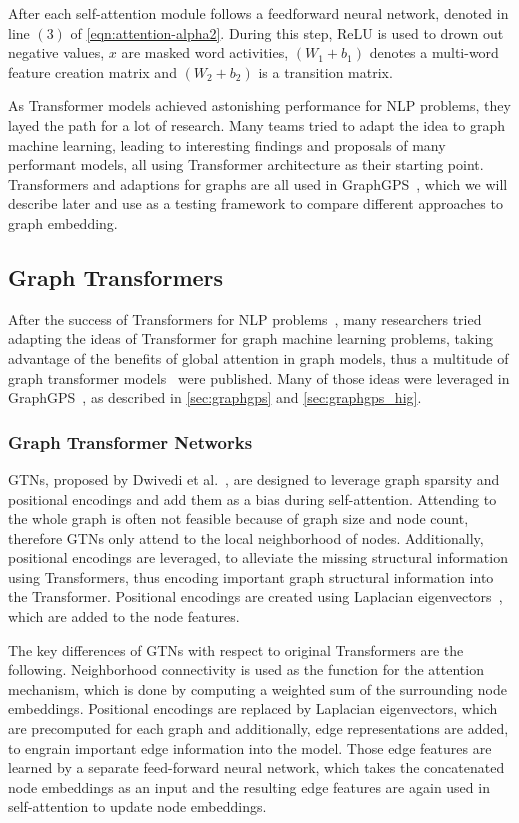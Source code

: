 After each self-attention module follows a feedforward neural network, denoted in line $(3)$ of \autoref{eqn:attention-alpha2}. During this step, ReLU is used to drown out negative values, $x$ are masked word activities, $(W_1 + b_1)$ denotes a multi-word feature creation matrix and $(W_2 + b_2)$ is a transition matrix.

As Transformer models achieved astonishing performance for NLP problems, they layed the path for a lot of research. Many teams tried to adapt the idea to graph machine learning, leading to interesting findings and proposals of many performant models, all using Transformer architecture as their starting point. Transformers and adaptions for graphs are all used in GraphGPS~\cite{2023graphgps}, which we will describe later and use as a testing framework to compare different approaches to graph embedding.
\subsection{Graph Transformers}
After the success of Transformers for NLP problems~\cite{kalyan2021ammus}, many researchers tried adapting the ideas of Transformer for graph machine learning problems, taking advantage of the benefits of global attention in graph models, thus a multitude of graph transformer models~\cite{dwivedi2021generalizationTransformer,2021graphormer,kreuzer2021rethinking,mialon2021graphit,wu2022representing} were published. Many of those ideas were leveraged in GraphGPS~\cite{2023graphgps}, as described in \ref{sec:graphgps} and \ref{sec:graphgps_hig}.

\subsubsection{Graph Transformer Networks}
GTNs, proposed by Dwivedi et al.~\cite{dwivedi2021generalizationTransformer}, are designed to leverage graph sparsity and positional encodings and add them as a bias during self-attention. Attending to the whole graph is often not feasible because of graph size and node count, therefore GTNs only attend to the local neighborhood of nodes. Additionally, positional encodings are leveraged, to alleviate the missing structural information using Transformers, thus encoding important graph structural information into the Transformer. Positional encodings are created using Laplacian eigenvectors~\cite{belkin2003laplacian}, which are added to the node features.

The key differences of GTNs with respect to original Transformers are the following. Neighborhood connectivity is used as the function for the attention mechanism, which is done by computing a weighted sum of the surrounding node embeddings. Positional encodings are replaced by Laplacian eigenvectors, which are precomputed for each graph and additionally, edge representations are added, to engrain important edge information into the model. Those edge features are learned by a separate feed-forward neural network, which takes the concatenated node embeddings as an input and the resulting edge features are again used in self-attention to update node embeddings.


